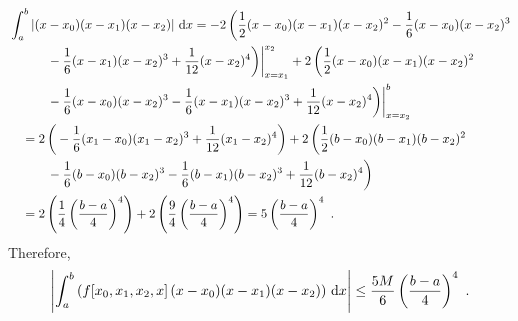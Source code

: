 {\begin{align*}
&\int_a^b \left|(x-x_0)(x-x_1)(x-x_2) \right|\,\mathrm{d}x
= - 2\, \bigg( \frac{1}{2}(x-x_0)(x-x_1)(x-x_2)^2 -
\frac{1}{6}(x-x_0)(x-x_2)^3 \\
&\quad \qquad - \frac{1}{6}(x-x_1)(x-x_2)^3
+ \frac{1}{12}(x-x_2)^4 \bigg)\bigg|_{x=x_1}^{x_2}
+2\, \bigg( \frac{1}{2}(x-x_0)(x-x_1)(x-x_2)^2 \\
&\quad \qquad - \frac{1}{6}(x-x_0)(x-x_2)^3
- \frac{1}{6}(x-x_1)(x-x_2)^3
+ \frac{1}{12}(x-x_2)^4 \bigg)\bigg|_{x=x_2}^b \\
&\quad =  2\, \bigg( -\frac{1}{6}(x_1-x_0)(x_1-x_2)^3
+ \frac{1}{12}(x_1-x_2)^4 \bigg)
+2\, \bigg( \frac{1}{2}(b-x_0)(b-x_1)(b-x_2)^2  \\
&\quad\qquad  - \frac{1}{6}(b-x_0)(b-x_2)^3
- \frac{1}{6}(b-x_1)(b-x_2)^3 + \frac{1}{12}(b-x_2)^4 \bigg) \\
&\quad =  2\left( \frac{1}{4} \left(\frac{b-a}{4}\right)^4 \right)
  +2 \left( \frac{9}{4} \left(\frac{b-a}{4}\right)^4 \right)
=  5 \left(\frac{b-a}{4}\right)^4  \ .
\end{align*}
Therefore,
\[
\left| \int_a^b \left(f[x_0,x_1,x_2,x]\,(x-x_0)(x-x_1)(x-x_2)
  \right)\,\mathrm{d}x \right| \leq \frac{5 M}{6} \left(\frac{b-a}{4}\right)^4 \ .
\]
}

